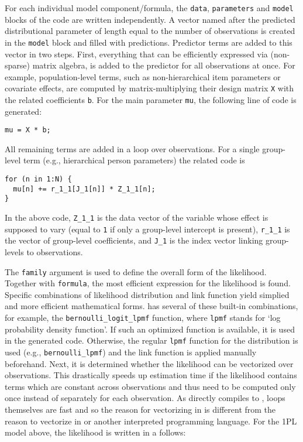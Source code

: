 \documentclass[
]{jss}
\begin{document}
For each individual model component/formula, the \texttt{data},
\texttt{parameters} and \texttt{model} blocks of the 
code are written independently. A vector named after the predicted
distributional parameter of length equal to the number of observations
is created in the \texttt{model} block and filled with predictions.
Predictor terms are added to this vector in two steps. First, everything
that can be efficiently expressed via (non-sparse) matrix algebra, is
added to the predictor for all observations at once. For example,
population-level terms, such as non-hierarchical item parameters or
covariate effects, are computed by matrix-multiplying their design
matrix \texttt{X} with the related coefficients \texttt{b}. For the main
parameter \texttt{mu}, the following line of  code is
generated:

\begin{verbatim}
mu = X * b;
\end{verbatim}

All remaining terms are added in a loop over observations. For a single
group-level term (e.g., hierarchical person parameters) the related
 code is

\begin{verbatim}
for (n in 1:N) {
  mu[n] += r_1_1[J_1[n]] * Z_1_1[n];
}
\end{verbatim}

In the above code, \texttt{Z\_1\_1} is the data vector of the variable
whose effect is supposed to vary (equal to \texttt{1} if only a
group-level intercept is present), \texttt{r\_1\_1} is the vector of
group-level coefficients, and \texttt{J\_1} is the index vector linking
group-levels to observations.

The \texttt{family} argument is used to define the overall form of the
likelihood. Together with \texttt{formula}, the most efficient
 expression for the likelihood is found. Specific
combinations of likelihood distribution and link function yield simplied
and more efficient mathematical forms.  has several of
these built-in combinations, for example, the
\texttt{bernoulli\_logit\_lpmf} function, where \texttt{lpmf} stands for
`log probability density function'. If such an optimized function is
available, it is used in the generated  code. Otherwise,
the regular \texttt{lpmf} function for the distribution is used (e.g.,
\texttt{bernoulli\_lpmf}) and the link function is applied manually
beforehand. Next, it is determined whether the likelihood can be
vectorized over observations. This drastically speeds up estimation time
if the likelihood contains terms which are constant across observations
and thus need to be computed only once instead of separately for each
observation. As  directly compiles to ,
loops themselves are fast and so the reason for vectorizing in
 is different from the reason to vectorize in
 or another interpreted programming language. For the 1PL
model above, the likelihood is written in  a follows:
\end{document}

